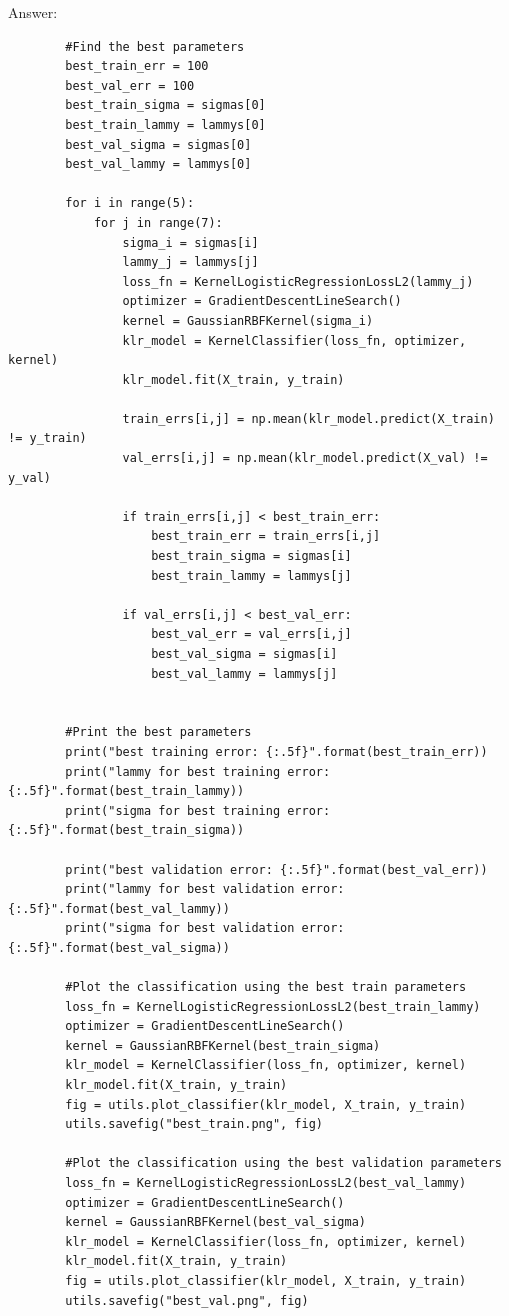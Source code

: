 \documentclass{article}
\newenvironment{answer}{\par\begingroup\color{gre}Answer: }{\endgroup}
\begin{document}
\begin{answer}
	\clearpage

	\begin{verbatim}
		#Find the best parameters	
		best_train_err = 100
		best_val_err = 100
		best_train_sigma = sigmas[0]
		best_train_lammy = lammys[0]
		best_val_sigma = sigmas[0]
		best_val_lammy = lammys[0]

		for i in range(5):
			for j in range(7):
				sigma_i = sigmas[i]
				lammy_j = lammys[j]
				loss_fn = KernelLogisticRegressionLossL2(lammy_j)
				optimizer = GradientDescentLineSearch()
				kernel = GaussianRBFKernel(sigma_i)
				klr_model = KernelClassifier(loss_fn, optimizer, kernel)
				klr_model.fit(X_train, y_train)

				train_errs[i,j] = np.mean(klr_model.predict(X_train) != y_train)
				val_errs[i,j] = np.mean(klr_model.predict(X_val) != y_val)

				if train_errs[i,j] < best_train_err:
					best_train_err = train_errs[i,j]
					best_train_sigma = sigmas[i]
					best_train_lammy = lammys[j]
				
				if val_errs[i,j] < best_val_err:
					best_val_err = val_errs[i,j]
					best_val_sigma = sigmas[i]
					best_val_lammy = lammys[j]


		#Print the best parameters        
		print("best training error: {:.5f}".format(best_train_err))
		print("lammy for best training error: {:.5f}".format(best_train_lammy))
		print("sigma for best training error: {:.5f}".format(best_train_sigma))

		print("best validation error: {:.5f}".format(best_val_err))
		print("lammy for best validation error: {:.5f}".format(best_val_lammy))
		print("sigma for best validation error: {:.5f}".format(best_val_sigma))

		#Plot the classification using the best train parameters
		loss_fn = KernelLogisticRegressionLossL2(best_train_lammy)
		optimizer = GradientDescentLineSearch()
		kernel = GaussianRBFKernel(best_train_sigma)
		klr_model = KernelClassifier(loss_fn, optimizer, kernel)
		klr_model.fit(X_train, y_train)
		fig = utils.plot_classifier(klr_model, X_train, y_train)
		utils.savefig("best_train.png", fig)

		#Plot the classification using the best validation parameters
		loss_fn = KernelLogisticRegressionLossL2(best_val_lammy)
		optimizer = GradientDescentLineSearch()
		kernel = GaussianRBFKernel(best_val_sigma)
		klr_model = KernelClassifier(loss_fn, optimizer, kernel)
		klr_model.fit(X_train, y_train)
		fig = utils.plot_classifier(klr_model, X_train, y_train)
		utils.savefig("best_val.png", fig)
	\end{verbatim}
	
\end{answer}
\end{document}
